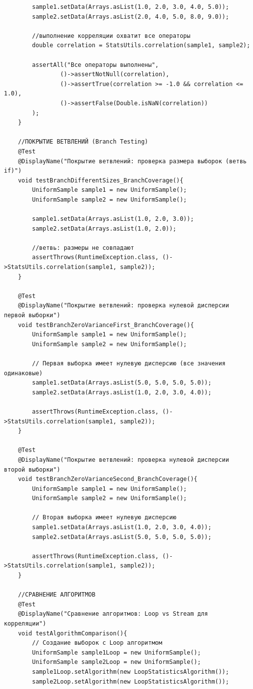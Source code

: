 \begin{verbatim}
        sample1.setData(Arrays.asList(1.0, 2.0, 3.0, 4.0, 5.0));
        sample2.setData(Arrays.asList(2.0, 4.0, 5.0, 8.0, 9.0));

        //выполнение корреляции охватит все операторы
        double correlation = StatsUtils.correlation(sample1, sample2);

        assertAll("Все операторы выполнены",
                ()->assertNotNull(correlation),
                ()->assertTrue(correlation >= -1.0 && correlation <= 1.0),
                ()->assertFalse(Double.isNaN(correlation))
        );
    }

    //ПОКРЫТИЕ ВЕТВЛЕНИЙ (Branch Testing)
    @Test
    @DisplayName("Покрытие ветвлений: проверка размера выборок (ветвь if)")
    void testBranchDifferentSizes_BranchCoverage(){
        UniformSample sample1 = new UniformSample();
        UniformSample sample2 = new UniformSample();

        sample1.setData(Arrays.asList(1.0, 2.0, 3.0));
        sample2.setData(Arrays.asList(1.0, 2.0));

        //ветвь: размеры не совпадают
        assertThrows(RuntimeException.class, ()->StatsUtils.correlation(sample1, sample2));
    }

    @Test
    @DisplayName("Покрытие ветвлений: проверка нулевой дисперсии первой выборки")
    void testBranchZeroVarianceFirst_BranchCoverage(){
        UniformSample sample1 = new UniformSample();
        UniformSample sample2 = new UniformSample();

        // Первая выборка имеет нулевую дисперсию (все значения одинаковые)
        sample1.setData(Arrays.asList(5.0, 5.0, 5.0, 5.0));
        sample2.setData(Arrays.asList(1.0, 2.0, 3.0, 4.0));

        assertThrows(RuntimeException.class, ()->StatsUtils.correlation(sample1, sample2));
    }

    @Test
    @DisplayName("Покрытие ветвлений: проверка нулевой дисперсии второй выборки")
    void testBranchZeroVarianceSecond_BranchCoverage(){
        UniformSample sample1 = new UniformSample();
        UniformSample sample2 = new UniformSample();

        // Вторая выборка имеет нулевую дисперсию
        sample1.setData(Arrays.asList(1.0, 2.0, 3.0, 4.0));
        sample2.setData(Arrays.asList(5.0, 5.0, 5.0, 5.0));

        assertThrows(RuntimeException.class, ()->StatsUtils.correlation(sample1, sample2));
    }

    //СРАВНЕНИЕ АЛГОРИТМОВ
    @Test
    @DisplayName("Сравнение алгоритмов: Loop vs Stream для корреляции")
    void testAlgorithmComparison(){
        // Создание выборок с Loop алгоритмом
        UniformSample sample1Loop = new UniformSample();
        UniformSample sample2Loop = new UniformSample();
        sample1Loop.setAlgorithm(new LoopStatisticsAlgorithm());
        sample2Loop.setAlgorithm(new LoopStatisticsAlgorithm());


\end{verbatim}
